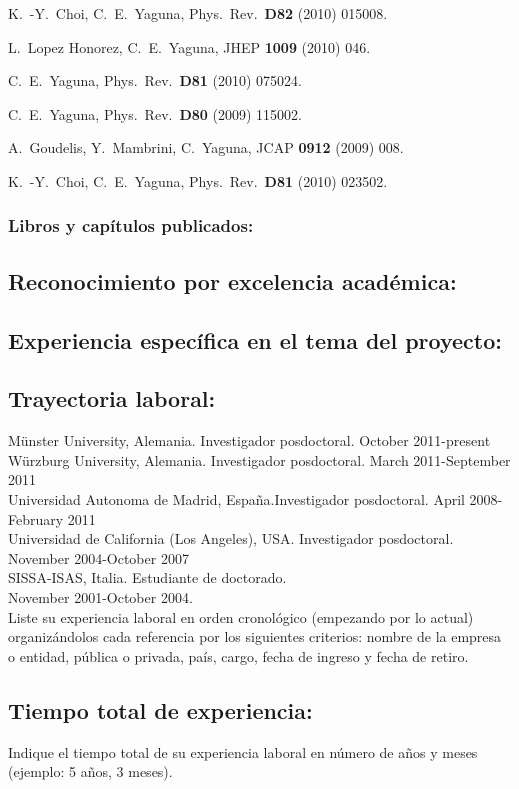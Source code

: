   K.~-Y.~Choi, C.~E.~Yaguna,
  Phys.\ Rev.\  {\bf D82 } (2010)  015008.

  L.~Lopez Honorez, C.~E.~Yaguna,
  JHEP {\bf 1009 } (2010)  046.

  C.~E.~Yaguna,
  Phys.\ Rev.\  {\bf D81 } (2010)  075024.

  C.~E.~Yaguna,
  Phys.\ Rev.\  {\bf D80 } (2009)  115002.

  A.~Goudelis, Y.~Mambrini, C.~Yaguna,
  JCAP {\bf 0912 } (2009)  008.

  K.~-Y.~Choi, C.~E.~Yaguna,
  Phys.\ Rev.\  {\bf D81 } (2010)  023502.
\subsubsection{Libros y capítulos publicados:}
\subsection{Reconocimiento por excelencia académica:}
\subsection{Experiencia específica en el tema del proyecto:}
\subsection{Trayectoria laboral:}
\begin{instrucciones}
M\"unster University, Alemania. Investigador posdoctoral. October 2011-present\\
W\"urzburg University, Alemania. Investigador posdoctoral. March 2011-September 2011\\
Universidad Autonoma de Madrid, España.Investigador posdoctoral. April 2008-February 2011\\
Universidad de California (Los Angeles), USA. Investigador posdoctoral. November 2004-October 2007\\
SISSA-ISAS, Italia. Estudiante de doctorado.\\ November 2001-October 2004.\\

  Liste su experiencia laboral en orden cronológico (empezando por lo
  actual) organizándolos cada referencia por los siguientes criterios:
  nombre de la empresa o entidad, pública o privada, país, cargo,
  fecha de ingreso y fecha de retiro.
\end{instrucciones}
\subsection{Tiempo total de experiencia:}
\begin{instrucciones}
  Indique el tiempo total de su experiencia laboral en número de años
  y meses (ejemplo: 5 años, 3 meses).
\end{instrucciones}


